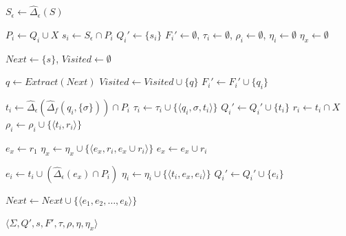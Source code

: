   \SetAlgoNoLine
  \begin{algorithm}[H]
    \caption{Quasi-determinization of a k-separated finite-state automaton}
    \label{alg:quasi_det_sfsa}

    \DontPrintSemicolon

    $S_\epsilon \gets \hat{\Delta}_\epsilon(S)$\;

     {
      $P_i \gets Q_i \cup X$\;
      $s_i \gets S_\epsilon \cap P_i$\;
      $Q_i' \gets \{ s_i \}$\;
      $F_i' \gets \emptyset$, $\tau_i \gets \emptyset$, $\rho_i \gets \emptyset$,
      $\eta_i \gets \emptyset$\;
    }
    $\eta_x \gets \emptyset$\;

    $Next \gets \{ s \}$, $Visited \gets \emptyset$\;

     {
      $q \gets Extract(Next)$\;
      $Visited \gets Visited \cup \{ q \}$\;
       {
         {
          $F_i' \gets F_i' \cup \{ q_i \}$\;
        }
      }

      \For {$\sigma \in \Sigma$} {
         {
          $t_i \gets \hat{\Delta}_\epsilon(\hat{\Delta}_f(q_i, \{
            \sigma \})) \cap P_i$\;
          $\tau_i \gets \tau_i \cup \{ \langle q_i, \sigma, t_i
            \rangle \}$\;
          $Q_i' \gets Q_i' \cup \{ t_i \}$\;
          $r_i \gets t_i \cap X$\;
          $\rho_i \gets \rho_i \cup \{ \langle t_i, r_i \rangle
            \}$\;
        }

        $e_x \gets r_1$\;
         {
          $\eta_x \gets \eta_x \cup \{ \langle e_x, r_i, e_x \cup r_i \rangle \}$\;
          $e_x \gets e_x \cup r_i$\;
        }

         {
          $e_i \gets t_i \cup (\hat{\Delta}_\epsilon(e_x) \cap P_i)$\;
          $\eta_i \gets \eta_i \cup \{ \langle t_i, e_x, e_i \rangle \}$\;
          $Q_i' \gets Q_i' \cup \{ e_i \}$\;
        }

         {
          $Next \gets Next \cup \{ \langle e_1, e_2, \ldots, e_k \rangle
            \}$\;
        }
      }
    }

    \Return $\langle \Sigma, Q', s, F', \tau, \rho, \eta, \eta_x \rangle$
  \end{algorithm}

